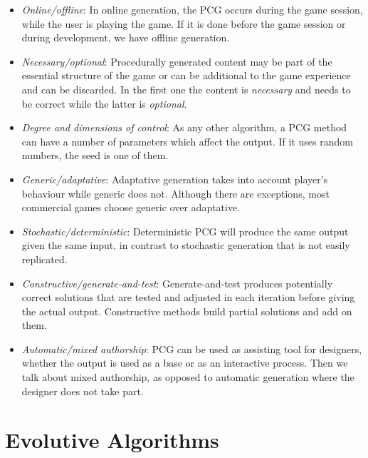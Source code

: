 \begin{itemize}
	\item \textit{Online/offline}: In online generation, the \ac{PCG} occurs during the game session, while the user is playing the game. If it is done before the game session or during development, we have offline generation. 
	\item \textit{Necessary/optional}: Procedurally generated content may be part of the essential structure of the game  or can be additional to the game experience and can be discarded. In the first one the content is \textit{necessary} and needs to be correct while the latter is \textit{optional}.
	\item \textit{Degree and dimensions of control}: As any other algorithm, a \ac{PCG} method can have a number of parameters which affect the output. If it uses random numbers, the seed is one of them.
	\item \textit{Generic/adaptative}: Adaptative generation takes into account player's behaviour while generic does not. Although there are exceptions, most commercial games choose generic over adaptative.
	\item \textit{Stochastic/deterministic}: Deterministic \ac{PCG} will produce the same output given the same input, in contrast to stochastic generation that is not easily replicated.
	\item \textit{Constructive/generate-and-test}: Generate-and-test produces potentially correct solutions that are tested and adjusted in each iteration before giving the actual output. Constructive methods build partial solutions and add on them.
	\item \textit{Automatic/mixed authorship}: \ac{PCG} can be used as assisting tool for designers, whether the output is used as a base or as an interactive process. Then we talk about mixed authorship, as opposed to automatic generation where the designer does not take part. 
\end{itemize}

\section{Evolutive Algorithms}
